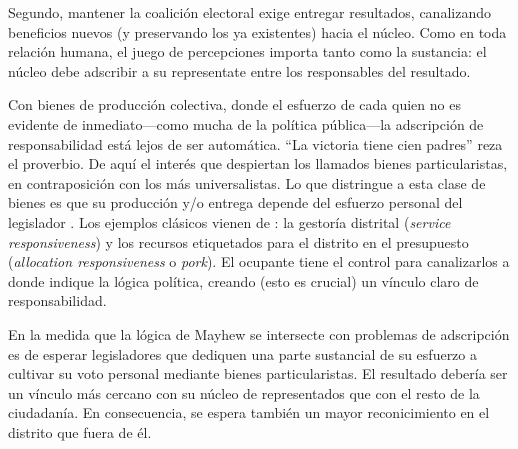 \documentclass[letter,12pt]{article}
\begin{document}
Segundo, mantener la coalición electoral exige entregar resultados, canalizando beneficios nuevos (y preservando los ya existentes) hacia el núcleo. Como en toda relación humana, el juego de percepciones importa tanto como la sustancia: el núcleo debe adscribir a su representate entre los responsables del resultado. 

Con bienes de producción colectiva, donde el esfuerzo de cada quien no es evidente de inmediato---como mucha de la política pública---la adscripción de responsabilidad está lejos de ser automática. ``La victoria tiene cien padres'' reza el proverbio. De aquí el interés que despiertan los llamados bienes particularistas, en contraposición con los más universalistas. Lo que distringue a esta clase de bienes es que su producción y/o entrega depende del esfuerzo personal del legislador \citep{haggard.mccubbins.2001}. Los ejemplos clásicos vienen de \citet{cain.etal.1987}: la gestoría distrital (\emph{service responsiveness}) y los recursos etiquetados para el distrito en el presupuesto (\emph{allocation responsiveness} o \emph{pork}). El ocupante tiene el control para canalizarlos a donde indique la lógica política, creando (esto es crucial) un vínculo claro de responsabilidad.

En la medida que la lógica de Mayhew se intersecte con problemas de adscripción es de esperar legisladores que dediquen una parte sustancial de su esfuerzo a cultivar su voto personal mediante bienes particularistas. El resultado debería ser un vínculo más cercano con su núcleo de representados que con el resto de la ciudadanía. En consecuencia, se espera también un mayor reconicimiento en el distrito que fuera de él. 



\end{document}
